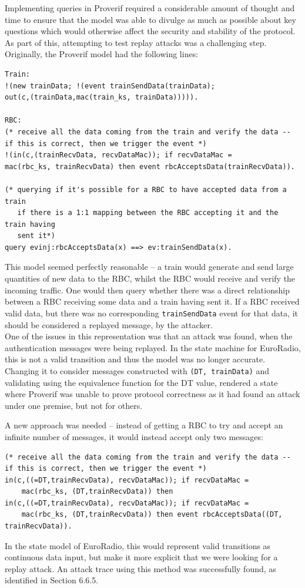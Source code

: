 \documentclass[twoside,11pt,a4paper]{article}
\begin{document}
Implementing queries in Proverif required a considerable amount of thought and time to ensure that the model was able to divulge as much as possible about key questions which would otherwise affect the security and stability of the protocol. As part of this, attempting to test replay attacks was a challenging step. Originally, the Proverif model had the following lines:
\begin{verbatim}
Train:
!(new trainData; !(event trainSendData(trainData); 
out(c,(trainData,mac(train_ks, trainData))))).

RBC:
(* receive all the data coming from the train and verify the data -- 
if this is correct, then we trigger the event *)
!(in(c,(trainRecvData, recvDataMac)); if recvDataMac = 
mac(rbc_ks, trainRecvData) then event rbcAcceptsData(trainRecvData)).

(* querying if it's possible for a RBC to have accepted data from a train
   if there is a 1:1 mapping between the RBC accepting it and the train having
   sent it*)
query evinj:rbcAcceptsData(x) ==> ev:trainSendData(x).
\end{verbatim}

This model seemed perfectly reasonable -- a train would generate and send large quantities of new data to the RBC, whilst the RBC would receive and verify the incoming traffic. One would then query whether there was a direct relationship between a RBC receiving some data and a train having sent it. If a RBC received valid data, but there was no corresponding \texttt{trainSendData} event for that data, it should be considered a replayed message, by the attacker.\\
One of the issues in this representation was that an attack was found, when the authentication messages were being replayed. In the state machine for EuroRadio, this is not a valid transition and thus the model was no longer accurate. Changing it to consider messages constructed with \texttt{(DT, trainData)} and validating using the equivalence function for the DT value, rendered a state where Proverif was unable to prove protocol correctness as it had found an attack under one premise, but not for others.

A new approach was needed -- instead of getting a RBC to try and accept an infinite number of messages, it would instead accept only two messages:
\begin{verbatim}
(* receive all the data coming from the train and verify the data -- 
if this is correct, then we trigger the event *)
in(c,((=DT,trainRecvData), recvDataMac)); if recvDataMac = 
	mac(rbc_ks, (DT,trainRecvData)) then
in(c,((=DT,trainRecvData), recvDataMac)); if recvDataMac = 
	mac(rbc_ks, (DT,trainRecvData)) then event rbcAcceptsData((DT, trainRecvData)).
\end{verbatim}
In the state model of EuroRadio, this would represent valid transitions as continuous data input, but make it more explicit that we were looking for a replay attack. An attack trace using this method was successfully found, as identified in Section 6.6.5.
\end{document}
